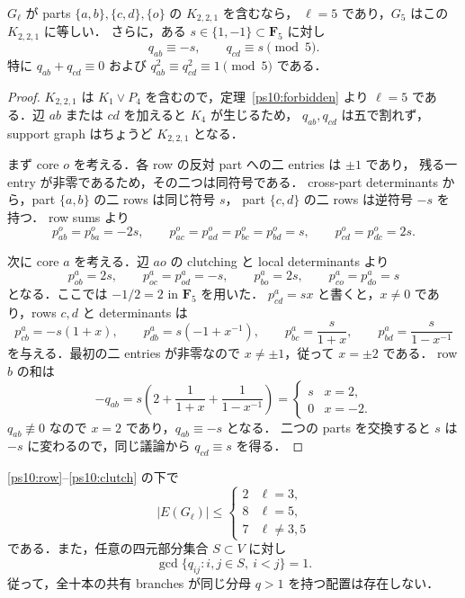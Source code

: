 \begin{proposition}[$K_{2,2,1}$ と残る二分母]\label{ps10:k221}
$G_\ell$ が parts $\{a,b\},\{c,d\},\{o\}$ の $K_{2,2,1}$ を含むなら，
$\ell=5$ であり，$G_5$ はこの $K_{2,2,1}$ に等しい．
さらに，ある $s\in\{1,-1\}\subset\mathbf F_5$ に対し
\begin{equation}\label{ps10:k221-residues}
 q_{ab}\equiv-s,\qquad q_{cd}\equiv s\pmod5.
\end{equation}
特に $q_{ab}+q_{cd}\equiv0$ および $q_{ab}^2\equiv q_{cd}^2\equiv1\pmod5$ である．
\end{proposition}

\begin{proof}
$K_{2,2,1}$ は $K_1\vee P_4$ を含むので，定理~\ref{ps10:forbidden} より
$\ell=5$ である．辺 $ab$ または $cd$ を加えると $K_4$ が生じるため，
$q_{ab},q_{cd}$ は五で割れず，support graph はちょうど $K_{2,2,1}$ となる．

まず core $o$ を考える．各 row の反対 part への二 entries は $\pm1$ であり，
残る一 entry が非零であるため，その二つは同符号である．
cross-part determinants から，part $\{a,b\}$ の二 rows は同じ符号 $s$，
part $\{c,d\}$ の二 rows は逆符号 $-s$ を持つ．
row sums より
\[
 p^o_{ab}=p^o_{ba}=-2s,
 \qquad p^o_{ac}=p^o_{ad}=p^o_{bc}=p^o_{bd}=s,
 \qquad p^o_{cd}=p^o_{dc}=2s.
\]

次に core $a$ を考える．辺 $ao$ の clutching と local determinants より
\[
 p^a_{ob}=2s,\qquad p^a_{oc}=p^a_{od}=-s,
 \qquad p^a_{bo}=2s,\qquad p^a_{co}=p^a_{do}=s
\]
となる．ここでは $-1/2=2$ in $\mathbf F_5$ を用いた．
$p^a_{cd}=s x$ と書くと，$x\ne0$ であり，rows $c,d$ と determinants は
\[
 p^a_{cb}=-s(1+x),\qquad
 p^a_{db}=s(-1+x^{-1}),\qquad
 p^a_{bc}=\frac{s}{1+x},\qquad
 p^a_{bd}=\frac{s}{1-x^{-1}}
\]
を与える．最初の二 entries が非零なので $x\ne\pm1$，従って $x=\pm2$ である．
row $b$ の和は
\[
 -q_{ab}
 =s\left(2+\frac1{1+x}+\frac1{1-x^{-1}}\right)
 =\begin{cases}s&x=2,\\0&x=-2.\end{cases}
\]
$q_{ab}\not\equiv0$ なので $x=2$ であり，$q_{ab}\equiv-s$ となる．
二つの parts を交換すると $s$ は $-s$ に変わるので，同じ議論から
$q_{cd}\equiv s$ を得る．
\end{proof}

\begin{corollary}\label{ps10:counts-gcd}
\eqref{ps10:row}--\eqref{ps10:clutch} の下で
\[
 |E(G_\ell)|\le
 \begin{cases}
 2&\ell=3,\\
 8&\ell=5,\\
 7&\ell\ne3,5
 \end{cases}
\]
である．また，任意の四元部分集合 $S\subset V$ に対し
\begin{equation}\label{ps10:gcd}
 \gcd\{q_{ij}:i,j\in S,\ i<j\}=1.
\end{equation}
従って，全十本の共有 branches が同じ分母 $q>1$ を持つ配置は存在しない．
\end{corollary}

